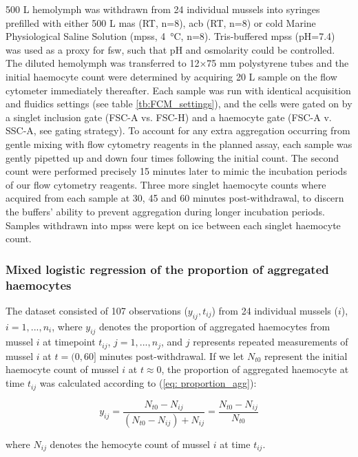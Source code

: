 500 \micro L hemolymph was withdrawn from 24 individual mussels into syringes prefilled with either 500 \micro L \acrshort{mas} (RT, n=8), \acrshort{acb} (RT, n=8) or cold Marine Physiological Saline Solution (\acrshort{mpss}, \SI{4}{\celsius}, n=8). Tris-buffered \acrshort{mpss} (pH=7.4) was used as a proxy for \acrshort{fsw}, such that pH and osmolarity could be controlled. The diluted hemolymph was transferred to 12$\times$75 mm polystyrene tubes and the initial haemocyte count were determined by acquiring 20 \micro L sample on the flow cytometer immediately thereafter. Each sample was run with identical acquisition and fluidics settings (see table \ref{tb:FCM_settings}), and the cells were gated on by a singlet inclusion gate (FSC-A vs. FSC-H) and a haemocyte gate (FSC-A v. SSC-A, see gating strategy). To account for any extra aggregation occurring from gentle mixing with flow cytometry reagents in the planned assay, each sample was gently pipetted up and down four times following the initial count. The second count were performed precisely 15 minutes later to mimic the incubation periods of our flow cytometry reagents. Three more singlet haemocyte counts where acquired from each sample at 30, 45 and 60 minutes post-withdrawal, to discern the buffers' ability to prevent aggregation during longer incubation periods. Samples withdrawn into \acrshort{mpss} were kept on ice between each singlet haemocyte count.

\subsubsection{Mixed logistic regression of the proportion of aggregated haemocytes}
The dataset consisted of 107 observations ($y_{ij}, t_{ij}$) from 24 individual mussels ($i$), $i = 1,...,n_{i}$, where $y_{ij}$ denotes the proportion of aggregated haemocytes from mussel $i$ at timepoint $t_{ij}$, $j = 1,...,n_{j}$, and $j$ represents repeated measurements of mussel $i$ at $t = (0, 60]$ minutes post-withdrawal. If we let $N_{t0}$ represent the initial haemocyte count of mussel $i$ at $t \approx 0$, the proportion of aggregated haemocyte at time $t_{ij}$ was calculated according to (\ref{eq: proportion_agg}):

\begin{equation}
    \label{eq: proportion_agg}
    y_{ij} = \dfrac{N_{t0} - N_{ij}}{(N_{t0} - N_{ij}) + N_{ij}} = \dfrac{N_{t0} - N_{ij}}{N_{t0}}
\end{equation}

\noindent where $N_{ij}$ denotes the hemocyte count of mussel $i$ at time $t_{ij}$.

